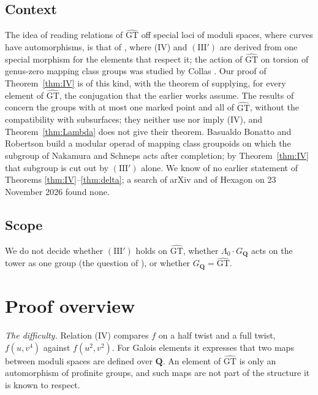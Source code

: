 \documentclass[11pt,a4paper]{article}
\theoremstyle{plain}
\theoremstyle{definition}
\theoremstyle{remark}
\newcommand{\GT}{\widehat{\mathrm{GT}}}
\newcommand{\Q}{\mathbf Q}
\newcommand{\GQ}{G_{\mathbf Q}}
\begin{document}
\subsection*{Context}
The idea of reading relations of $\GT$ off special loci of moduli spaces, where curves have automorphisms, is that
of \cite{S}, where (IV) and $(\mathrm{III}')$ are derived from one special morphism for the elements that respect
it; the action of $\GT$ on torsion of genus-zero mapping class groups was studied by Collas \cite{Co}. Our proof
of Theorem~\ref{thm:IV} is of this kind, with the theorem of \cite{BZ} supplying, for every element of $\GT$, the
conjugation that the earlier works assume. The results of \cite{LNS} concern the groups with at most one marked
point and all of $\GT$, without the compatibility with subsurfaces; they neither use nor imply (IV), and
Theorem~\ref{thm:Lambda} does not give their theorem. Basualdo Bonatto and Robertson \cite{BBR} build a modular
operad of mapping class groupoids on which the subgroup of Nakamura and Schneps acts after completion; by
Theorem~\ref{thm:IV} that subgroup is cut out by $(\mathrm{III}')$ alone. We know of no earlier statement of
Theorems \ref{thm:IV}--\ref{thm:delta}; a search of arXiv and of Hexagon on 23 November 2026 found none.

\subsection*{Scope}
We do not decide whether $(\mathrm{III}')$ holds on $\GT$, whether $\Lambda_0\cdot\GQ$ acts on the tower as one
group (the question of \cite[\S8]{LNS}), or whether $\GQ=\GT$.

\section{Proof overview}

\emph{The difficulty.} Relation (IV) compares $f$ on a half twist and a full twist, $f(u,v^4)$ against
$f(u^2,v^2)$. For Galois elements it expresses that two maps between moduli spaces are defined over $\Q$. An
element of $\GT$ is only an automorphism of profinite groups, and such maps are not part of the structure it is
known to respect.
\end{document}
